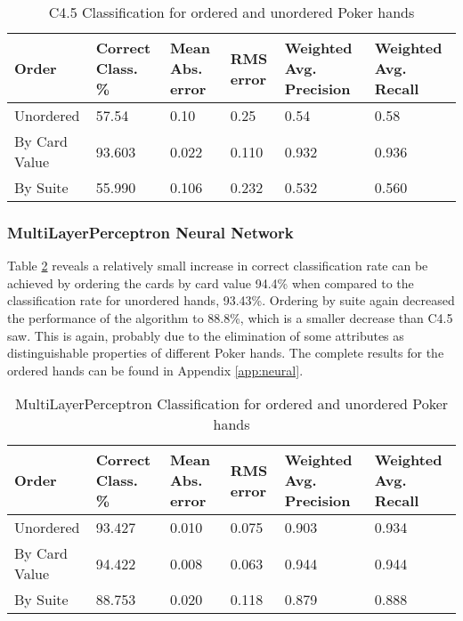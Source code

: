 \documentclass[10pt, a4paper]{article}
\begin{document}
\begin{table}[htbp]
  \centering  
    \begin{tabular}{p{3cm}p{1.5cm}p{1.5cm}p{1.5cm}p{1.5cm}p{1.5cm}}
    \toprule
    \textbf{Order} & Correct Class. \% & Mean Abs. error & RMS error & Weighted Avg. Precision & Weighted Avg. Recall \\
    \midrule
    Unordered & 57.54 & 0.10  & 0.25  & 0.54  & 0.58 \\
    By Card Value & 93.603 & 0.022 & 0.110 & 0.932 & 0.936 \\
    By Suite & 55.990 & 0.106 & 0.232 & 0.532 & 0.560 \\
    \bottomrule
    \end{tabular}%
  \label{tab:addlabel}%
  \caption{C4.5 Classification for ordered and unordered Poker hands}
  \label{tab:dtoresults}%
\end{table}%

\subsubsection*{MultiLayerPerceptron Neural Network}

Table \ref{tab:nnoresults} reveals a relatively small increase in correct classification rate can be achieved by ordering the cards by card value 94.4\% when compared to the classification rate for unordered hands, 93.43\%. Ordering by suite again decreased the performance of the algorithm to 88.8\%, which is a smaller decrease than C4.5 saw. This is again, probably due to the elimination of some attributes as distinguishable properties of different Poker hands. The complete results for the ordered hands can be found in Appendix \ref{app:neural}.

\begin{table}[htbp]
  \centering  
    \begin{tabular}{p{3cm}p{1.5cm}p{1.5cm}p{1.5cm}p{1.5cm}p{1.5cm}}
    \toprule
    \textbf{Order} & Correct Class. \% & Mean Abs. error & RMS error & Weighted Avg. Precision & Weighted Avg. Recall \\
    \midrule
    Unordered & 93.427 & 0.010 & 0.075 & 0.903 & 0.934 \\
    By Card Value & 94.422 & 0.008 & 0.063 & 0.944 & 0.944 \\
    By Suite & 88.753 & 0.020 & 0.118 & 0.879 & 0.888 \\
    \bottomrule
    \end{tabular}%

  \caption{MultiLayerPerceptron Classification for ordered and unordered Poker hands}
  \label{tab:nnoresults}%
\end{table}%
\end{document}
